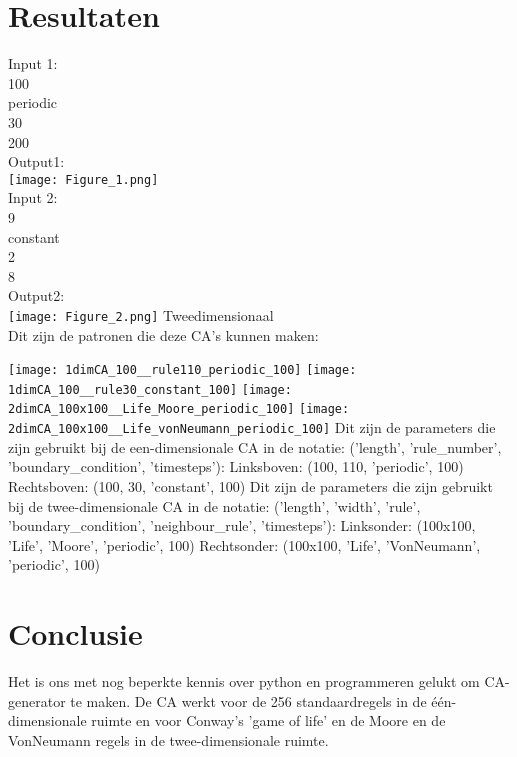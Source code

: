 \documentclass[12pt,a4paper]{article}
\begin{document}
\section*{Resultaten}
Input 1: \\
100 \\
periodic \\
30 \\
200 \\
\newline Output1: \\
\newline \texttt{[image: Figure\_1.png]} \\
Input 2: \\
9 \\
constant \\
2 \\
8 \\
\newline Output2: \\
\texttt{[image: Figure\_2.png]}
\newline\large{Tweedimensionaal} \\
\newline\normalsize
Dit zijn de patronen die deze CA's kunnen maken:
\newline
\graphicspath{ {./CA_project_2024/} }
\texttt{[image: 1dimCA\_100\_\_rule110\_periodic\_100]}
\texttt{[image: 1dimCA\_100\_\_rule30\_constant\_100]}
\texttt{[image: 2dimCA\_100x100\_\_Life\_Moore\_periodic\_100]}
\texttt{[image: 2dimCA\_100x100\_\_Life\_vonNeumann\_periodic\_100]}
\newline
Dit zijn de parameters die zijn gebruikt
bij de een-dimensionale CA in de notatie:
('length', 'rule\_number', 'boundary\_condition', 'timesteps'):
\newline
Linksboven: (100, 110, 'periodic', 100)
\newline
Rechtsboven: (100, 30, 'constant', 100)
\newline
Dit zijn de parameters die zijn gebruikt
bij de twee-dimensionale CA in de notatie:
('length', 'width', 'rule', 'boundary\_condition', 'neighbour\_rule', 'timesteps'):
\newline
Linksonder: (100x100, 'Life', 'Moore', 'periodic', 100)
\newline
Rechtsonder: (100x100, 'Life', 'VonNeumann', 'periodic', 100)


\section*{Conclusie}
Het is ons met nog beperkte kennis over python en programmeren gelukt om CA-generator te maken. De CA werkt voor de 256 standaardregels in de één-dimensionale ruimte en voor Conway's 'game of life' en de Moore en de VonNeumann regels in de twee-dimensionale ruimte.
\end{document}

